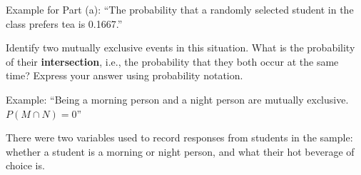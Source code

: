 \documentclass[noanswers]{exam}
\begin{document}
\begin{questions}
\begin{solution}[\stretch{1}]
Example for Part (a): ``The probability that a randomly selected student in the class prefers tea is 0.1667.''

\vspace{3mm}
\end{solution} 

\question Identify two mutually exclusive events in this situation. What is the probability of their \textbf{intersection}, i.e., the probability that they both occur at the same time? Express your answer using probability notation.

\begin{solution}[\stretch{1}]

\vspace{3mm}

Example: ``Being a morning person and a night person are mutually exclusive. $P(M\cap N)=0$''

\vspace{3mm}
\end{solution} 

\question There were two variables used to record responses from students in the sample: whether a student is a morning or night person, and what their hot beverage of choice is. 

\vspace{3mm}

\end{questions}
\end{document}
